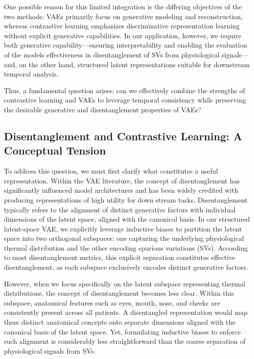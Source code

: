 One possible reason for this limited integration is the differing objectives of the two methods: VAEs primarily focus on generative modeling and reconstruction, whereas contrastive learning emphasizes discriminative representation learning without explicit generative capabilities. In our application, however, we require both generative capability—ensuring interpretability and enabling the evaluation of the models effectiveness in disentanglement of SVs from physiological signals—and, on the other hand, structured latent representations suitable for downstream temporal analysis.

Thus, a fundamental question arises: can we effectively combine the strengths of contrastive learning and VAEs to leverage temporal consistency while preserving the desirable generative and disentanglement properties of VAEs?

\subsection{Disentanglement and Contrastive Learning: A Conceptual Tension}

To address this question, we must first clarify what constitutes a useful representation. Within the VAE literature, the concept of disentanglement has significantly influenced model architectures and has been widely credited with producing representations of high utility for down stream tasks. Disentanglement typically refers to the alignment of distinct generative factors with individual dimensions of the latent space, aligned with the canonical basis. In our structured latent-space VAE, we explicitly leverage inductive biases to partition the latent space into two orthogonal subspaces: one capturing the underlying physiological thermal distribution and the other encoding spurious variations (SVs). According to most disentanglement metrics, this explicit separation constitutes effective disentanglement, as each subspace exclusively encodes distinct generative factors.

However, when we focus specifically on the latent subspace representing thermal distributions, the concept of disentanglement becomes less clear. Within this subspace, anatomical features such as eyes, mouth, nose, and cheeks are consistently present across all patients. A disentangled representation would map these distinct anatomical concepts onto separate dimensions aligned with the canonical basis of the latent space. Yet, formulating inductive biases to enforce such alignment is considerably less straightforward than the coarse separation of physiological signals from SVs.

